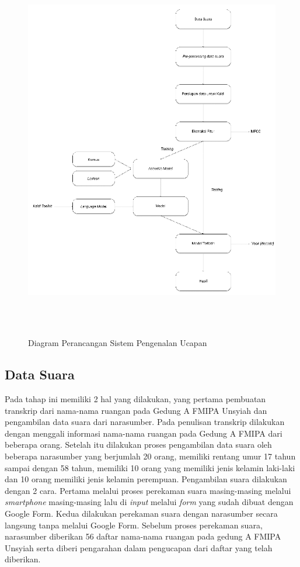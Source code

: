\begin{figure}[H]
\centering
{\includegraphics [width = 14cm, height= 16cm]{gambar/sr_perancangan}}
\caption{Diagram Perancangan Sistem Pengenalan Ucapan}
\label{sr_perancangan}
\end{figure}

\fancyhf{} 
\fancyfoot[R]{\thepage}

\subsection{Data Suara}
Pada tahap ini memiliki 2 hal yang dilakukan, yang pertama pembuatan transkrip dari nama-nama ruangan pada Gedung A FMIPA Unsyiah dan pengambilan data suara dari narasumber. Pada penulisan transkrip dilakukan dengan menggali informasi nama-nama ruangan pada Gedung A FMIPA dari beberapa orang. Setelah itu dilakukan proses pengambilan data suara oleh beberapa narasumber yang berjumlah 20 orang, memiliki rentang umur 17 tahun sampai dengan 58 tahun, memiliki 10 orang yang memiliki jenis kelamin laki-laki dan 10 orang memiliki jenis kelamin perempuan. Pengambilan suara dilakukan dengan 2 cara. Pertama melalui proses perekaman suara masing-masing melalui \textit{smartphone} masing-masing lalu di \textit{input} melalui \textit{form} yang sudah dibuat dengan Google Form. Kedua dilakukan perekaman suara dengan narasumber secara langsung tanpa melalui Google Form. Sebelum proses perekaman suara, narasumber diberikan 56 daftar nama-nama ruangan pada gedung A FMIPA Unsyiah serta diberi pengarahan dalam pengucapan dari daftar yang telah diberikan.

